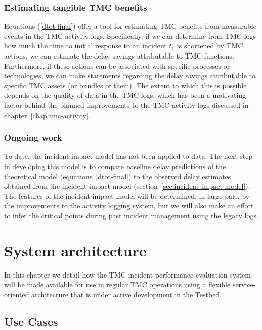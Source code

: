 \documentclass[12pt]{report}
\begin{document}
\subsection{Estimating tangible TMC benefits}
\label{sec:est-benefits}

Equations (\ref{dtot-final}) offer a tool for estimating TMC benefits
from measurable events in the TMC activity logs.  Specifically, if we
can determine from TMC logs how much the time to initial response to
an incident $t_1$ is shortened by TMC actions, we can estimate the
delay savings attributable to TMC functions.  Furthermore, if these
actions can be associated with specific processes or technologies, we
can make statements regarding the delay savings attributable to
specific TMC assets (or bundles of them). The extent to which this is
possible depends on the quality of data in the TMC logs, which has
been a motivating factor behind the planned improvements to the TMC
activity logs discussed in chapter~\ref{chap:tmc-activity}.


\subsection{Ongoing work}
\label{sec:ongoing-work-tmc-impact}

To date, the incident impact model has not been applied to data.  The
next step in developing this model is to compare baseline delay
predictions of the theoretical model (equations~\ref{dtot-final}) to
the observed delay estimates obtained from the incident impact model
(section~\ref{sec:incident-impact-model}).  The features of the
incident impact model will be determined, in large part, by the
improvements to the activity logging system, but we will also make an
effort to infer the critical points during past incident management
using the legacy logs.



\chapter{System architecture}
\label{sec:system-architecture}


In this chapter we detail how the TMC incident performance evaluation
system will be made available for use in regular TMC operations using
a flexible service-oriented architecture that is under active
development in the Testbed.

\section{Use Cases}
\label{sec:use-cases}
\end{document}
